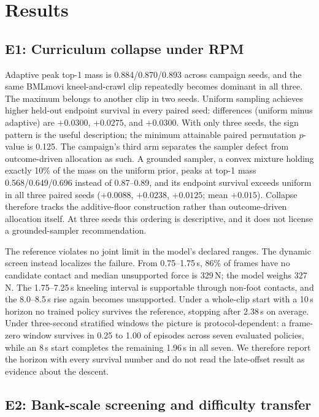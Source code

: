 \documentclass[letterpaper,10pt,conference]{ieeeconf}
\begin{document}
\section{Results}

\subsection{E1: Curriculum collapse under RPM}

Adaptive peak top-1 mass is 0.884/0.870/0.893 across campaign seeds, and the same BMLmovi
kneel-and-crawl clip repeatedly becomes dominant in all three. The maximum belongs to another
clip in two seeds. Uniform sampling achieves higher held-out endpoint survival in every paired
seed: differences (uniform minus adaptive) are $+0.0300$, $+0.0275$, and $+0.0300$. With only
three seeds, the sign pattern is the useful description; the minimum attainable paired
permutation $p$-value is 0.125.
The campaign's third arm separates the sampler defect from outcome-driven allocation as such.
A grounded sampler, a convex mixture holding exactly 10\% of the mass on the uniform prior,
peaks at top-1 mass 0.568/0.649/0.696 instead of 0.87--0.89, and its endpoint survival exceeds
uniform in all three paired seeds ($+0.0088$, $+0.0238$, $+0.0125$; mean $+0.015$). Collapse
therefore tracks the additive-floor construction rather than outcome-driven allocation itself.
At three seeds this ordering is descriptive, and it does not license a grounded-sampler
recommendation.

The reference violates no joint limit in the model's declared ranges. The
dynamic screen instead localizes the failure. From 0.75--1.75\,s, 86\%
of frames have no candidate contact and median unsupported force is 329\,N; the model weighs
327\,N. The 1.75--7.25\,s kneeling interval is supportable through non-foot contacts, and the
8.0--8.5\,s rise again becomes unsupported. Under a whole-clip start with a 10\,s horizon no
trained policy survives the reference, stopping after 2.38\,s on average. Under three-second
stratified windows the picture is protocol-dependent: a frame-zero window survives in 0.25 to
1.00 of episodes across seven evaluated policies, while an 8\,s start completes the remaining
1.96\,s in all seven. We therefore report the horizon with every survival number and do not
read the late-offset result as evidence about the descent.

\subsection{E2: Bank-scale screening and difficulty transfer}
\end{document}
